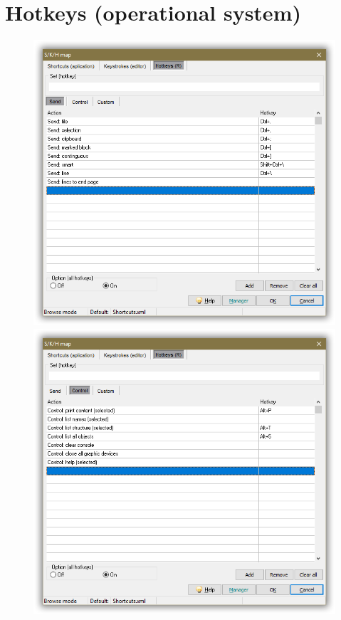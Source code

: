 
\hypertarget{working_hotkeys}{}
\section{Hotkeys (operational system)}

\begin{figure}[H]
  \includegraphics[scale=0.36]{./res/hotkeys_send.png}
  \includegraphics[scale=0.36]{./res/hotkeys_control.png}

\end{figure}
